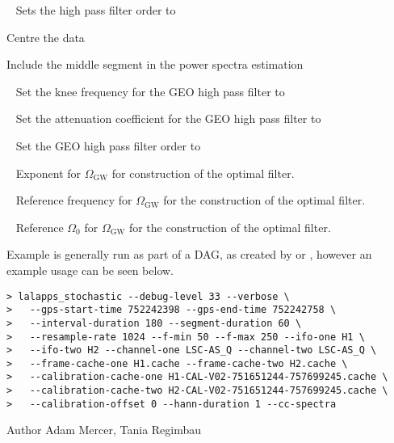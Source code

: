 \begin{entry}
\begin{entry}
\item[\option{--hpf-order}~\parm{N}]
Sets the high pass filter order to 

\item[\option{--recentre}]
Centre the data

\item[\option{--middle-segment}]
Include the middle segment in the power spectra estimation

\item[\option{--geo-hpf-frequency}~\parm{N}]
Set the knee frequency for the GEO high pass filter to 

\item[\option{--geo-hpf-attenuation}~\parm{N}]
Set the attenuation coefficient for the GEO high pass filter to 

\item[\option{--geo-hpf-order}~\parm{N}]
Set the GEO high pass filter order to 

\item[\option{--alpha}~\parm{N}]
Exponent for $\Omega_{\mathrm{GW}}$ for construction of the optimal
filter.

\item[\option{--f-ref}~\parm{N}]
Reference frequency for $\Omega_{\mathrm{GW}}$ for the construction of
the optimal filter.

\item[\option{--omega0}~\parm{N}]
Reference $\Omega_0$ for $\Omega_{\mathrm{GW}}$ for the construction of
the optimal filter.
\end{entry}

\item[Example]
 is generally run as part of a DAG, as created
by  or
, however an example usage can be seen
below.

\begin{verbatim}
> lalapps_stochastic --debug-level 33 --verbose \
>   --gps-start-time 752242398 --gps-end-time 752242758 \
>   --interval-duration 180 --segment-duration 60 \
>   --resample-rate 1024 --f-min 50 --f-max 250 --ifo-one H1 \
>   --ifo-two H2 --channel-one LSC-AS_Q --channel-two LSC-AS_Q \
>   --frame-cache-one H1.cache --frame-cache-two H2.cache \
>   --calibration-cache-one H1-CAL-V02-751651244-757699245.cache \
>   --calibration-cache-two H2-CAL-V02-751651244-757699245.cache \
>   --calibration-offset 0 --hann-duration 1 --cc-spectra
\end{verbatim}

\item[Author] 
Adam Mercer, Tania Regimbau
\end{entry}
